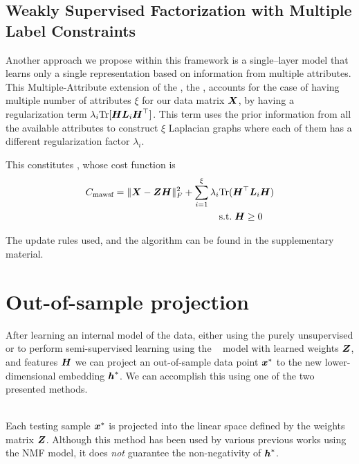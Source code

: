 \documentclass[10pt,journal,compsoc]{IEEEtran}
\begin{document}
\subsection{Weakly Supervised Factorization with Multiple Label Constraints}
Another approach we propose within this framework is a single--layer \wsf model that learns only a single representation based on information from multiple attributes. This Multiple-Attribute extension of the \wsf, the  \mawsf, accounts for the case of having multiple number of attributes $\xi$ for our data matrix $\boldsymbol{X}$, by having a regularization term $\lambda_i \text{Tr}[\boldsymbol{H} \boldsymbol{L}_i \boldsymbol{H}^{\top}]$. This term uses the prior information from all the available attributes to construct $\xi$ Laplacian graphs where each of them has a different regularization factor $\lambda_i$.

This constitutes \mawsf, whose cost function is
\begin{align}\notag
C_{\text{mawsf}}=\|{\boldsymbol{X}} - {\boldsymbol{Z}}{\boldsymbol{H}}\|^2_F + \sum_{i=1}^\xi \lambda_i &\text{Tr}(\boldsymbol{H}^{\top} \boldsymbol{L}_i \boldsymbol{H})\\ &\text{s.t.}\; \boldsymbol{H} \geq 0
\end{align}



The update rules used, and the algorithm can be found in the supplementary material.  


\section{Out-of-sample projection} %
\label{sub:project_out_of_sample_data}

After learning an internal model of the data, either using the purely unsupervised \deepseminmf or to perform semi-supervised learning using the \dwsf~ model  with learned weights $\boldsymbol{Z}$, and features $\boldsymbol{H}$ we can project an out-of-sample data point $\boldsymbol{x}^{\ast}$ to the new lower-dimensional embedding $\boldsymbol{h}^{\ast}$. We can accomplish this using one of the two presented methods.

\vspace{0.5cm}

\\ Each testing sample $\boldsymbol{x}^{\ast}$ is projected into the linear space defined by the weights matrix $\boldsymbol{Z}$. Although this method has been used by various previous works \cite{Turk1991a,Li2001} using the NMF model, it does {\it not} guarantee the non-negativity of $\boldsymbol{h}^{\ast}$.
\end{document}
